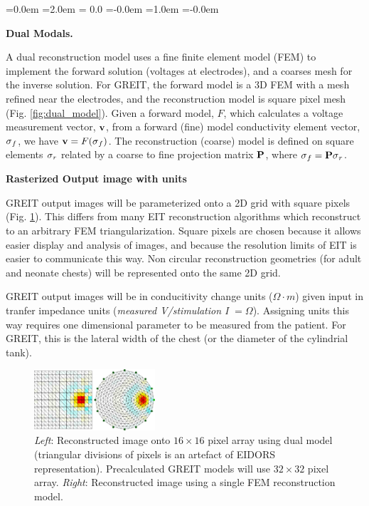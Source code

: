 \documentclass[letterpaper,twocolumn,11pt]{article}
\newcommand{\vB}{\mbox{$\bf v$}}
\newcommand{\PB}{\mbox{$\bf P$}}
\newcommand{\sG}{\mbox{$\bf \sigma$}}
\begin{document}
\begin{list}{\bf {}.}
  {\leftmargin=0.0em \itemindent=2.0em
    \topsep= 0.0\baselineskip
    \itemsep=-0.0em
    \listparindent=1.0em \parsep=-0.0em
    }

\item {\bf Dual Modals.}

A dual reconstruction model uses a fine finite element
model (FEM) to implement the forward solution (voltages
at electrodes), and a coarses mesh for the inverse
solution. For GREIT, the forward model is a 3D FEM with
a mesh refined near the electrodes, and the reconstruction
model is square pixel mesh (Fig. \ref{fig:dual_model}).
Given a forward model, $F$,
which calculates a voltage measurement vector, $\vB$, from
a forward (fine) model conductivity element vector, $\sG_f$, we
have $\vB = F( \sG_f )$. The reconstruction (coarse)
model is defined on square elements $\sG_r$ related by
a coarse to fine projection matrix $\PB$, where $\sG_f = \PB \sG_r$.

\item {\bf Rasterized Output image with units}

GREIT output images will be parameterized onto
a 2D grid with square pixels (Fig. \ref{fig:square_pixels}).
This differs from many EIT reconstruction algorithms
which reconstruct to an arbitrary FEM triangularization.
Square pixels are chosen because it allows easier
display and analysis of images, and because the 
resolution limits of EIT is easier to communicate this way.
Non circular reconstruction geometries (for adult and
neonate chests) will be represented onto the same 2D grid.

GREIT output images will be in conducitivity change units
($\Omega\cdot m$) given input in tranfer impedance units
({\em measured V/stimulation I} $=\Omega$). Assigning units
this way requires one dimensional parameter to be measured
from the patient. For GREIT, this is the lateral width of
the chest (or the diameter of the cylindrial tank).

\begin{figure}[tbh]
\begin{center}
 \includegraphics[width= 0.4\textwidth, bb=0 0 749 378]{figs/square_mesh06a.png}
\caption{ \label{fig:square_pixels}
{\em Left}: Reconstructed image onto $16\times 16$ pixel array using
dual model (triangular divisions of pixels is an artefact of EIDORS
representation). Precalculated GREIT models
will use $32\times 32$ pixel array.
{\em Right}: Reconstructed image using a single FEM reconstruction model.
}
\end{center}
\end{figure}


\end{list}
\end{document}
